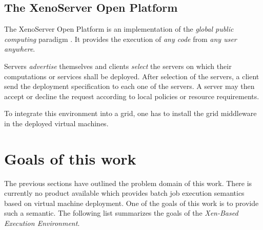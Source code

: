 \subsection{The XenoServer Open Platform}

The  XenoServer Open  Platform is  an implementation  of  the \emph{global
  public   computing}  paradigm   \cite{kotsovinos05}.  It   provides  the
execution of \emph{any code} from \emph{any user} \emph{anywhere}.

Servers \emph{advertise} themselves  and clients \emph{select} the servers
on which their computations or services shall be deployed. After selection
of the servers, a client send  the deployment specification to each one of
the servers. A server may then  accept or decline the request according to
local policies or resource requirements.

To integrate  this environment into  a grid, one  has to install  the grid
middleware in the deployed virtual machines.

\section{Goals of this work}
\label{sec:goals}

The previous sections have outlined the problem domain of this work. There
is  currently no  product  available which  provides  batch job  execution
semantics based on  virtual machine deployment.  One of  the goals of this
work is  to provide  such a semantic.   The following list  summarizes the
goals of the \emph{Xen-Based Execution Environment}.


